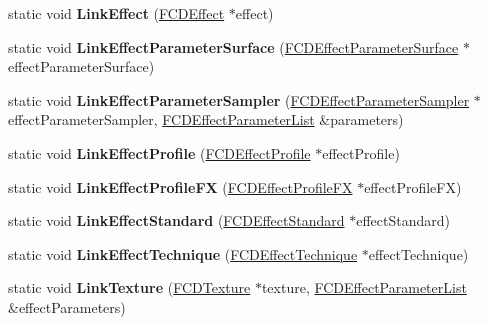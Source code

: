 \begin{DoxyCompactItemize}
\item 
\hypertarget{classFArchiveXML_ae4a2da5304f0dbcae547bd12612ba201}{
static void {\bfseries LinkEffect} (\hyperlink{classFCDEffect}{FCDEffect} $\ast$effect)}
\label{classFArchiveXML_ae4a2da5304f0dbcae547bd12612ba201}

\item 
\hypertarget{classFArchiveXML_a5e1d8508feb0480b2af04f085f852644}{
static void {\bfseries LinkEffectParameterSurface} (\hyperlink{classFCDEffectParameterSurface}{FCDEffectParameterSurface} $\ast$effectParameterSurface)}
\label{classFArchiveXML_a5e1d8508feb0480b2af04f085f852644}

\item 
\hypertarget{classFArchiveXML_ae5e7f79e96acedf504819447f0a95e7d}{
static void {\bfseries LinkEffectParameterSampler} (\hyperlink{classFCDEffectParameterSampler}{FCDEffectParameterSampler} $\ast$effectParameterSampler, \hyperlink{classfm_1_1pvector}{FCDEffectParameterList} \&parameters)}
\label{classFArchiveXML_ae5e7f79e96acedf504819447f0a95e7d}

\item 
\hypertarget{classFArchiveXML_a220022712dbe7a2b82ae8c4b4263526d}{
static void {\bfseries LinkEffectProfile} (\hyperlink{classFCDEffectProfile}{FCDEffectProfile} $\ast$effectProfile)}
\label{classFArchiveXML_a220022712dbe7a2b82ae8c4b4263526d}

\item 
\hypertarget{classFArchiveXML_a5cd590dc516bb8685a91f3178995a549}{
static void {\bfseries LinkEffectProfileFX} (\hyperlink{classFCDEffectProfileFX}{FCDEffectProfileFX} $\ast$effectProfileFX)}
\label{classFArchiveXML_a5cd590dc516bb8685a91f3178995a549}

\item 
\hypertarget{classFArchiveXML_abfe6cf3544b64877e0860a129aa241c2}{
static void {\bfseries LinkEffectStandard} (\hyperlink{classFCDEffectStandard}{FCDEffectStandard} $\ast$effectStandard)}
\label{classFArchiveXML_abfe6cf3544b64877e0860a129aa241c2}

\item 
\hypertarget{classFArchiveXML_a6dc44608a425b4f5ba4c2e7f630e115d}{
static void {\bfseries LinkEffectTechnique} (\hyperlink{classFCDEffectTechnique}{FCDEffectTechnique} $\ast$effectTechnique)}
\label{classFArchiveXML_a6dc44608a425b4f5ba4c2e7f630e115d}

\item 
\hypertarget{classFArchiveXML_a2f06bd7040ce72f22da8b20de08083bc}{
static void {\bfseries LinkTexture} (\hyperlink{classFCDTexture}{FCDTexture} $\ast$texture, \hyperlink{classfm_1_1pvector}{FCDEffectParameterList} \&effectParameters)}
\label{classFArchiveXML_a2f06bd7040ce72f22da8b20de08083bc}


\end{DoxyCompactItemize}
